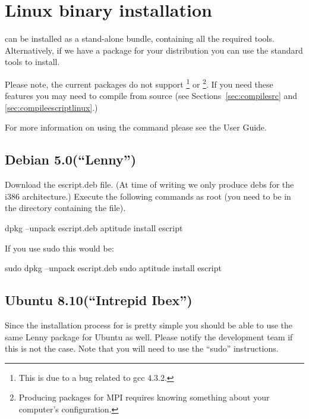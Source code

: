 
%
%
%

\section{Linux binary installation}
\label{sec:binlinux}

\esfinley can be installed as a stand-alone bundle, containing all the required tools.
Alternatively, if we have a package for your distribution you can use the standard tools to install.

Please note, the current packages do not support \openmp\footnote{This is due to a bug related to gcc 4.3.2.} or \mpi\footnote{Producing packages for MPI requires knowing something about your computer's configuration.}.
If you need these features you may need to compile \esfinley from source (see Sections~\ref{sec:compilesrc} and \ref{sec:compileescriptlinux}.)

For more information on using the  command please see the User Guide.

\subsection{Debian 5.0(``Lenny'')}

Download the escript.deb file.
(At time of writing we only produce debs for the i386 architecture.)
Execute the following commands as root (you need to be in the directory containing the file).
\begin{shellCode}
 dpkg --unpack escript.deb
 aptitude install escript
\end{shellCode}

If you use sudo this would be:
\begin{shellCode}
sudo dpkg --unpack escript.deb
sudo aptitude install escript
\end{shellCode}

\subsection{Ubuntu 8.10(``Intrepid Ibex'')}

Since the installation process for \esfinley is pretty simple you should be able to use the same Lenny package for Ubuntu as well.
Please notify the development team if this is not the case.
Note that you will need to use the ``sudo'' instructions.


